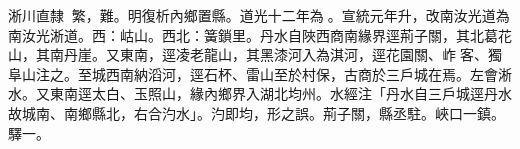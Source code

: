 \begin{pinyinscope}
淅川直隸：繁，難。明復析內鄉置縣。道光十二年為。宣統元年升，改南汝光道為南汝光淅道。西：岵山。西北：簧鎖里。丹水自陜西商南緣界逕荊子關，其北葛花山，其南丹崖。又東南，逕凌老龍山，其黑漆河入為淇河，逕花園關、岞客、獨阜山注之。至城西南納滔河，逕石杯、雷山至於村保，古商於三戶城在焉。左會淅水。又東南逕太白、玉照山，緣內鄉界入湖北均州。水經注「丹水自三戶城逕丹水故城南、南鄉縣北，右合汋水」。汋即均，形之誤。荊子關，縣丞駐。峽口一鎮。驛一。


\end{pinyinscope}